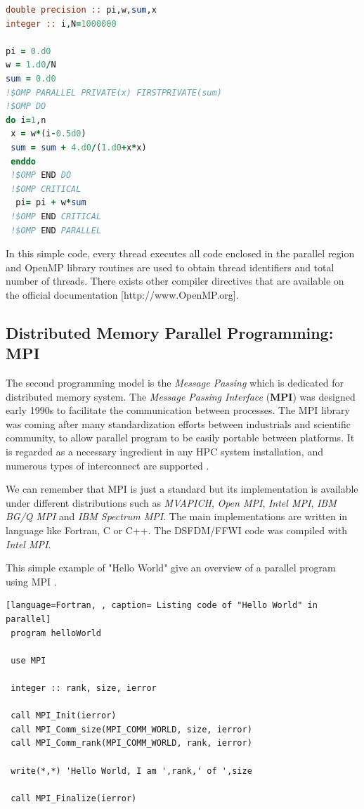 \begin{lstlisting}[language=Fortran, caption= Listing code of  numerical integration of \ref{pi}]
double precision :: pi,w,sum,x
integer :: i,N=1000000

pi = 0.d0
w = 1.d0/N
sum = 0.d0
!$OMP PARALLEL PRIVATE(x) FIRSTPRIVATE(sum)
!$OMP DO
do i=1,n
 x = w*(i-0.5d0)
 sum = sum + 4.d0/(1.d0+x*x)
 enddo
 !$OMP END DO
 !$OMP CRITICAL
  pi= pi + w*sum
 !$OMP END CRITICAL
 !$OMP END PARALLEL
\end{lstlisting}

In this simple code, every thread executes all code enclosed in the parallel region  and OpenMP library routines are used to obtain thread identifiers and total number of threads. There exists other compiler directives that are available on the official documentation [http://www.OpenMP.org].

\subsection{Distributed Memory Parallel Programming: MPI} \label{MPI}
The second programming model is the \textit{Message Passing} which is dedicated for distributed memory system. The \textit{Message Passing Interface} (\textbf{MPI}) was designed early 1990s to facilitate the communication between processes. The MPI library was coming after many standardization efforts between industrials and scientific community, to allow parallel program to be easily portable between platforms. It is regarded as a necessary ingredient in any HPC system installation, and numerous types of interconnect are supported \cite{Hager2010}. 

We can remember that MPI is just a standard but its implementation is available under different distributions such as \textit{MVAPICH}, \textit{Open MPI}, \textit{Intel MPI}, \textit{IBM BG/Q MPI} and \textit{IBM Spectrum MPI}. The main implementations are written in language like Fortran, C or C++. The DSFDM/FFWI code was compiled with \textit{Intel MPI}. 

This simple example of "Hello World" give an overview of a parallel program using MPI \cite{Hager2010}. 
\begin{lstlisting}[language=Fortran, , caption= Listing code of "Hello World" in parallel]
 program helloWorld 

 use MPI

 integer :: rank, size, ierror

 call MPI_Init(ierror)
 call MPI_Comm_size(MPI_COMM_WORLD, size, ierror)
 call MPI_Comm_rank(MPI_COMM_WORLD, rank, ierror)

 write(*,*) 'Hello World, I am ',rank,' of ',size

 call MPI_Finalize(ierror)
\end{lstlisting}

